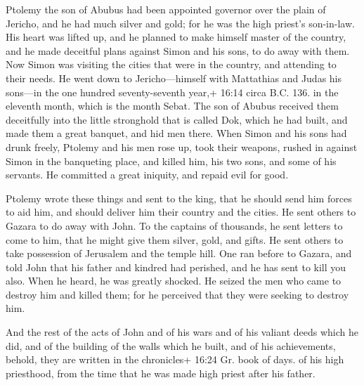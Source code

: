  Ptolemy the son of Abubus had been appointed governor over
the plain of Jericho, and he had much silver and gold;  for
he was the high priest's son-in-law.  His heart was lifted
up, and he planned to make himself master of the country, and he made
deceitful plans against Simon and his sons, to do away with them.
 Now Simon was visiting the cities that were in the
country, and attending to their needs. He went down to Jericho---himself
with Mattathias and Judas his sons---in the one hundred seventy-seventh
year,+ 16:14 circa B.C. 136. in the eleventh month, which is the month
Sebat.  The son of Abubus received them deceitfully into
the little stronghold that is called Dok, which he had built, and made
them a great banquet, and hid men there.  When Simon and
his sons had drunk freely, Ptolemy and his men rose up, took their
weapons, rushed in against Simon in the banqueting place, and killed
him, his two sons, and some of his servants.  He committed
a great iniquity, and repaid evil for good.

 Ptolemy wrote these things and sent to the king, that he
should send him forces to aid him, and should deliver him their country
and the cities.  He sent others to Gazara to do away with
John. To the captains of thousands, he sent letters to come to him, that
he might give them silver, gold, and gifts.  He sent others
to take possession of Jerusalem and the temple hill.  One
ran before to Gazara, and told John that his father and kindred had
perished, and he has sent to kill you also.  When he heard,
he was greatly shocked. He seized the men who came to destroy him and
killed them; for he perceived that they were seeking to destroy him.

 And the rest of the acts of John and of his wars and of
his valiant deeds which he did, and of the building of the walls which
he built, and of his achievements,  behold, they are
written in the chronicles+ 16:24 Gr. book of days. of his high
priesthood, from the time that he was made high priest after his father.
